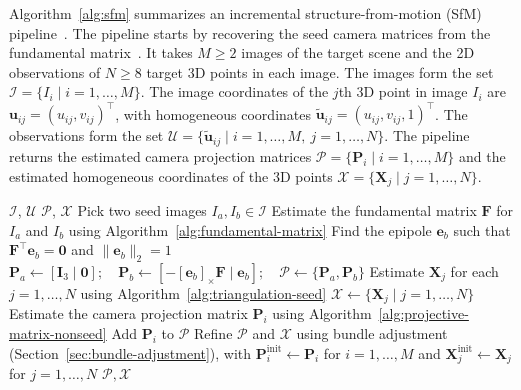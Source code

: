 \documentclass[11pt,a4paper]{article}
\begin{document}
Algorithm~\ref{alg:sfm} summarizes an incremental structure-from-motion (SfM) pipeline~\cite{opensfm,schonberger2016sfm}. The pipeline starts by recovering the seed camera matrices from the fundamental matrix~\cite[Sec.~9.5]{hartley2004mvg}. It takes \(M \geq 2\) images of the target scene and the 2D observations of \(N \geq 8\) target 3D points in each image. The images form the set \(\mathcal{I} = \{ I_i \mid i = 1, \dots, M \}\). The image coordinates of the \(j\)th 3D point in image \(I_i\) are \(\mathbf u_{ij}=(u_{ij},v_{ij})^\top\), with homogeneous coordinates \(\tilde{\mathbf u}_{ij}=(u_{ij},v_{ij},1)^\top\). The observations form the set \(\mathcal{U} = \{ \tilde{\mathbf u}_{ij} \mid i = 1, \dots, M,\ j = 1, \dots, N \}\). The pipeline returns the estimated camera projection matrices \(\mathcal{P} = \{ \mathbf{P}_i \mid i = 1, \dots, M \}\) and the estimated homogeneous coordinates of the 3D points \(\mathcal{X} = \{ \mathbf{X}_j \mid j = 1, \dots, N \}\).


\begin{algorithm}[htbp]
  \caption{Structure-from-Motion (SfM)}
  \label{alg:sfm}
  \begin{algorithmic}[1]
    \Require \(\mathcal{I}\), \(\mathcal{U}\)
    \Ensure \(\mathcal{P}\), \(\mathcal{X}\)
    \State Pick two seed images \(I_a, I_b \in \mathcal{I}\)
    \State Estimate the fundamental matrix \(\mathbf F\) for \(I_a\) and \(I_b\) using Algorithm~\ref{alg:fundamental-matrix}
    \State Find the epipole \(\mathbf e_b\) such that \(\mathbf F^\top\mathbf e_b = \mathbf 0\) and \(\|\mathbf e_b\|_2 = 1\)
    \State \(\mathbf{P}_a \gets [\mathbf{I}_3 \mid \mathbf 0]; \quad \mathbf{P}_b \gets [-[\mathbf e_b]_\times \mathbf F \mid \mathbf e_b]; \quad \mathcal{P} \gets \{\mathbf{P}_a, \mathbf{P}_b\}\)
    \State Estimate \(\mathbf X_j\) for each \(j = 1, \dots, N\) using Algorithm~\ref{alg:triangulation-seed}
    \State \(\mathcal{X} \gets \{ \mathbf X_j \mid j = 1, \dots, N \}\)
      \State Estimate the camera projection matrix \(\mathbf P_i\) using Algorithm~\ref{alg:projective-matrix-nonseed}
      \State Add \(\mathbf P_i\) to \(\mathcal{P}\)
    \EndFor
    \State Refine \(\mathcal{P}\) and \(\mathcal{X}\) using bundle adjustment (Section~\ref{sec:bundle-adjustment}), with \(\mathbf P_i^\text{init} \gets \mathbf P_i\) for \(i = 1, \dots, M\) and \(\mathbf X_j^\text{init} \gets \mathbf X_j\) for \(j = 1, \dots, N\)
    \State \Return \(\mathcal{P}, \mathcal{X}\)
  \end{algorithmic}
\end{algorithm}
\end{document}
